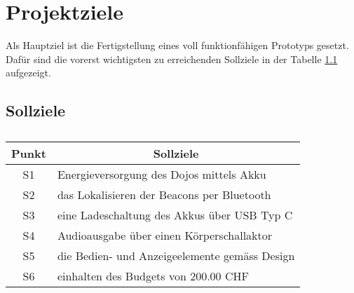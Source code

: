 \chapter{Projektziele}
\thispagestyle{fancy}  \setcounter{page}{1} \cfoot{\thepage} \renewcommand{\footrulewidth}{0.4pt} 
Als Hauptziel ist die Fertigstellung eines voll funktionfähigen Prototyps gesetzt. Dafür sind die vorerst wichtigsten zu erreichenden Sollziele in der Tabelle \ref{tab:sollziele} aufgezeigt.\\
\section*{Sollziele}
\begin{table}[h]
\centering
	\begin{tabular}{c|c|l}
	\toprule 
	\textbf{Punkt} & \multicolumn{2}{c}{\textbf{Sollziele}} \\
	\hline
	S1 & \multicolumn{2}{l}{Energieversorgung des Dojos mittels Akku} \\
	\hline
	S2 & \multicolumn{2}{l}{das Lokalisieren der Beacons per Bluetooth} \\
	\hline
	S3 & \multicolumn{2}{l}{eine Ladeschaltung des Akkus über USB Typ C} \\
	\hline
	S4 & \multicolumn{2}{l}{Audioausgabe über einen Körperschallaktor} \\
	\hline
	S5 & \multicolumn{2}{l}{die Bedien- und Anzeigeelemente gemäss Design} \\
	\hline
	S6 & \multicolumn{2}{l}{einhalten des Budgets von 200.00 CHF} \\
	\bottomrule 
	\end{tabular}
\caption{}
\label{tab:sollziele}
\end{table}

